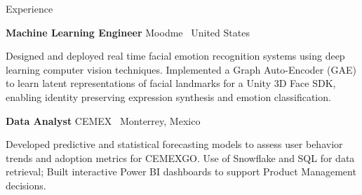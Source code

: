 \begin{rubric}{Experience}

\entry*[9/2023 -- 01/2024]
  \textbf{Machine Learning Engineer} \hfill Moodme \textbar\ United States
  \par
Designed and deployed real time facial emotion recognition systems using deep learning computer vision techniques.
Implemented a Graph Auto-Encoder (GAE) to learn latent representations of facial landmarks for a Unity 3D Face SDK, enabling identity preserving expression synthesis and emotion classification.


\entry*[02/2023 -- 08/2023]
  \textbf{Data Analyst} \hfill CEMEX \textbar\ Monterrey, Mexico
  \par
Developed predictive and statistical forecasting models to assess user behavior trends and adoption metrics for CEMEXGO.
Use of Snowflake and SQL for data retrieval; Built interactive Power BI dashboards to support Product Management decisions.
\end{rubric}
